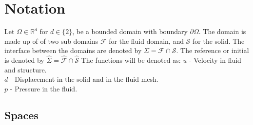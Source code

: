 \section*{Notation}
Let $\Omega \in \mathbb{R}^d $ for $d \in \{2\}$, be a bounded domain with boundary $ \partial \Omega$. The domain is made up of of two sub domains $ \mathcal{F} $ for the fluid domain, and $\mathcal{S}$ for the solid. The interface between the domains are denoted by $ \Sigma = \mathcal{F} \cap \mathcal{S} $. The reference or initial is denoted by $ \hat{\Sigma} = \hat{\mathcal{F}} \cap \hat{\mathcal{S}}  $ 
The functions will be denoted as:
$u$ - Velocity in fluid and structure. \\
$d$ - Displacement in the solid and in the fluid mesh.\\
$p$ - Pressure in the fluid. \\

\subsection{Spaces}


